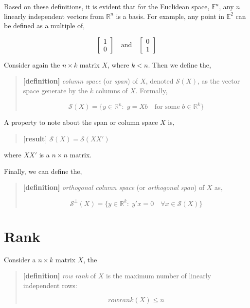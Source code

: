 \documentclass[
  letterpaper,
  DIV=11,
  numbers=noendperiod]{scrreprt}
\begin{document}
Based on these definitions, it is evident that for the Euclidean space,
\(\mathbb{E}^n\), any \(n\) linearly independent vectors from
\(\mathbb{R}^n\) is a basis. For example, any point in \(\mathbb{E}^2\)
can be defined as a multiple of,

\[
\begin{bmatrix}1\\0\end{bmatrix}\quad \text{and} \quad\begin{bmatrix}0\\1\end{bmatrix}
\]

Consider again the \(n\times k\) matrix \(X\), where \(k<n\). Then we
define the,

\begin{quote}
\textbf{{[}definition{]}} \emph{column space} (or \emph{span}) of \(X\),
denoted \(\mathcal{S}(X)\), as the vector space generate by the \(k\)
columns of \(X\). Formally,

\[
\mathcal{S}(X) = \{y\in\mathbb{R}^n:\;y=Xb\quad\text{for some }b\in \mathbb{R}^k\} 
\]
\end{quote}

A property to note about the span or column space \(X\) is,

\begin{quote}
\textbf{{[}result{]}} \(\mathcal{S}(X)=\mathcal{S}(XX')\)
\end{quote}

where \(XX'\) is a \(n\times n\) matrix.

Finally, we can define the,

\begin{quote}
\textbf{{[}definition{]}} \emph{orthogonal column space} (or
\emph{orthogonal} \emph{span}) of \(X\) as,

\[
\mathcal{S}^{\perp}(X) = \{y\in \mathbb{R}^k:\;y'x=0\quad \forall x\in\mathcal{S}(X)\}
\]
\end{quote}

\hypertarget{rank}{%
\section{Rank}\label{rank}}

Consider a \(n\times k\) matrix \(X\), the

\begin{quote}
\textbf{{[}definition{]}} \emph{row rank} of \(X\) is the maximum number
of linearly independent rows:

\[
rowrank(X) \leq n
\]
\end{quote}
\end{document}
